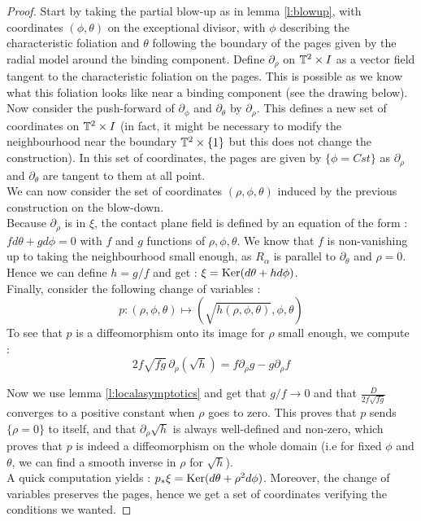 \documentclass[../main.tex]{subfiles}
\begin{document}
\begin{proof}

Start by taking the partial blow-up as in lemma \ref{l:blowup}, with coordinates $(\phi,\theta)$ on the exceptional divisor, with $\phi$ describing the characteristic foliation and $\theta$ following the boundary of the pages given by the radial model around the binding component. Define $\partial_\rho$ on $\mathbb{T}^2\times I$ as a vector field tangent to the characteristic foliation on the pages. This is possible as we know what this foliation looks like near a binding component (see the drawing below). Now consider the push-forward of $\partial_\phi$ and $\partial_\theta$ by $\partial_\rho$. This defines a new set of coordinates on $\mathbb{T}^2\times I$ (in fact, it might be necessary to modify the neighbourhood near the boundary $\mathbb{T}^2\times \{1\}$ but this does not change the construction). In this set of coordinates, the pages are given by $\{\phi = Cst\}$ as $\partial_\rho$ and $\partial_\theta$ are tangent to them at all point. \\

We can now consider the set of coordinates $(\rho,\phi,\theta)$ induced by the previous construction on the blow-down.\\
Because $\partial_\rho$ is in $\xi$, the contact plane field is defined by an equation of the form : $fd\theta + gd\phi = 0$ with $f$ and $g$ functions of $\rho,\phi,\theta$. We know that $f$ is non-vanishing up to taking the neighbourhood small enough, as $R_\alpha$ is parallel to $\partial_\theta$ and $\rho = 0$. Hence we can define $h = g/f$ and get : $\xi = \text{Ker}(d\theta + hd\phi)$. \\
Finally, consider the following change of variables : $$p : (\rho,\phi,\theta)\mapsto (\sqrt{h(\rho,\phi,\theta)},\phi,\theta)$$
To see that $p$ is a diffeomorphism onto its image for $\rho$ small enough, we compute : 
$$2f\sqrt{fg} \,\partial_\rho (\sqrt{h}) = f\partial_\rho g - g\partial_\rho f$$


Now we use lemma \ref{l:localasymptotics} and get that $g/f\rightarrow 0$ and that $\frac{D}{2f\sqrt{fg}}$ converges to a positive constant when $\rho$ goes to zero. This proves that $p$ sends $\{\rho = 0\}$ to itself, and that $\partial_\rho \sqrt{h}$ is always well-defined and non-zero, which proves that $p$ is indeed a diffeomorphism on the whole domain (i.e for fixed $\phi$ and $\theta$, we can find a smooth inverse in $\rho$ for $\sqrt{h}$).\\

A quick computation yields : $p_*\xi = \text{Ker}(d\theta + \rho^2d\phi) $. Moreover, the change of variables preserves the pages, hence we get a set of coordinates verifying the conditions we wanted.
    
\end{proof}
\end{document}
